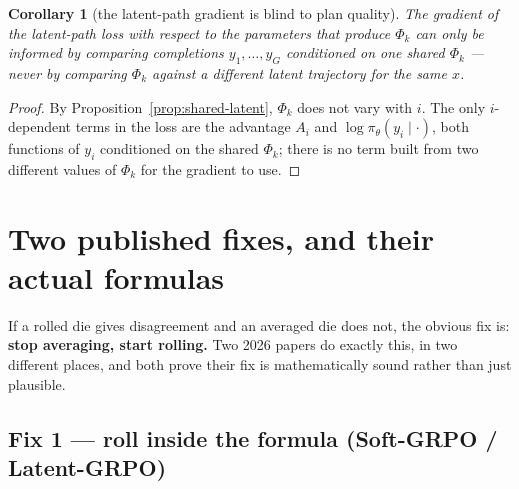 \documentclass[11pt]{article}
\newtheorem{corollary}[theorem]{Corollary}
\theoremstyle{definition}
\begin{document}
\begin{corollary}[the latent-path gradient is blind to plan quality]
\label{cor:latent-blind}
The gradient of the latent-path loss with respect to the parameters that produce $\Phi_k$ can only be informed by comparing completions $y_1,\dots,y_G$ conditioned on \emph{one shared} $\Phi_k$ --- never by comparing $\Phi_k$ against a different latent trajectory for the same $x$.
\end{corollary}
\begin{proof}
By Proposition~\ref{prop:shared-latent}, $\Phi_k$ does not vary with $i$. The only $i$-dependent terms in the loss are the advantage $A_i$ and $\log\pi_\theta(y_i\mid\cdot)$, both functions of $y_i$ conditioned on the shared $\Phi_k$; there is no term built from two different values of $\Phi_k$ for the gradient to use.
\end{proof}

\section{Two published fixes, and their actual formulas}
\label{sec:grpo-lit}
\label{sec:published-fixes}

If a rolled die gives disagreement and an averaged die does not, the obvious fix is: \textbf{stop averaging, start rolling.} Two 2026 papers do exactly this, in two different places, and both prove their fix is mathematically sound rather than just plausible.

\subsection{Fix 1 --- roll inside the formula (Soft-GRPO / Latent-GRPO)}
\end{document}
